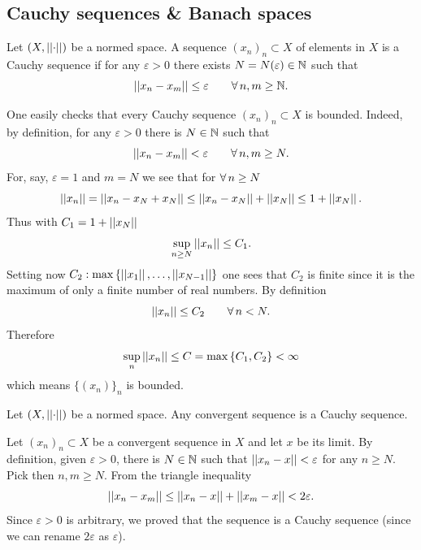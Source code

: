 \documentclass{article}
\begin{document}
\subsection{Cauchy sequences \& Banach spaces}
\begin{definition}
	Let $(X,\left|\left|\cdot\right|\right|)$ be a normed space. A sequence ${(x_{n})}_{n}\subset X$ of elements in $X$ is a Cauchy sequence if for any $\varepsilon>0$ there exists $N=N(\varepsilon)\in\mathbb{N}$ such that
	\begin{equation*}
		\left|\left|x_{n}-x_{m}\right|\right|\leq\varepsilon\qquad\forall\, n,m\geq\mathbb{N}.
	\end{equation*}
\end{definition}
One easily checks that every Cauchy sequence ${(x_{n})}_{n}\subset X$ is bounded. Indeed, by definition, for any $\varepsilon>0$ there is $N\in\mathbb{N}$ such that
\begin{equation*}
	\left|\left|x_{n}-x_{m}\right|\right|<\varepsilon\qquad\forall\, n,m\geq N.
\end{equation*} 
For, say, $\varepsilon=1$ and $m=N$ we see that for $\forall\, n\geq N$
\begin{equation*}
	\left|\left|x_{n}\right|\right|=\left|\left|x_{n}-x_{N}+x_{N}\right|\right|\leq\left|\left|x_{n}-x_{N}\right|\right|+\left|\left|x_{N}\right|\right|\leq 1+\left|\left|x_{N}\right|\right|.
\end{equation*}
Thus with $C_{1}=1+\left|\left|x_{N}\right|\right|$
\begin{equation*}
	\sup_{n\geq N}\left|\left|x_{n}\right|\right|\leq C_{1}.
\end{equation*}
Setting now $C_{2}:\max\left\{\left|\left|x_{1}\right|\right|,\ldots,\left|\left|x_{N-1}\right|\right|\right\}$ one sees that $C_{2}$ is finite since it is the maximum of only a finite number of real numbers. By definition
\begin{equation*}
	\left|\left|x_{n}\right|\right|\leq C_{2}\qquad\forall\, n<N.
\end{equation*}
Therefore
\begin{equation*}
	\sup_{n}\left|\left|x_{n}\right|\right|\leq C=\max\left\{C_1,C_2\right\}<\infty
\end{equation*}
which means $\{(x_{n})\}_{n}$ is bounded.
\begin{lemma}
	Let $(X,\left|\left|\cdot\right|\right|)$ be a normed space. Any convergent sequence is a Cauchy sequence.
\end{lemma}
\begin{fancyproof}
	Let ${(x_{n})}_{n}\subset X$ be a convergent sequence in $X$ and let $x$ be its limit. By definition, given $\varepsilon>0$, there is $N\in\mathbb{N}$ such that $\left|\left|x_{n}-x\right|\right|<\varepsilon$ for any $n\geq N$. Pick then $n,m\geq N$. From the triangle inequality
	\begin{equation*}
		\left|\left|x_{n}-x_{m}\right|\right|\leq\left|\left|x_{n}-x\right|\right|+\left|\left|x_{m}-x\right|\right|<2\varepsilon.
	\end{equation*}
	Since $\varepsilon>0$ is arbitrary, we proved that the sequence is a Cauchy sequence (since we can rename $2\varepsilon$ as $\varepsilon$).
\end{fancyproof}
\end{document}
